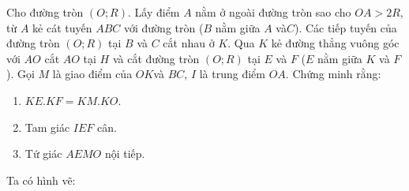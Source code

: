 \begin{ex}%
    Cho đường tròn $(O;R)$. Lấy điểm $A$ nằm ở ngoài đường tròn sao cho $OA>2R$, từ $A$ kẻ cát tuyến $ABC$ với đường tròn ($B$ nằm giữa $A$ và$C$). Các tiếp tuyến của đường tròn $(O;R)$ tại $B$ và $C$ cắt nhau ở $K$. Qua $K$ kẻ đường thẳng vuông góc với $AO$ cắt $AO$ tại $H$ và cắt đường tròn $(O;R)$ tại $E$ và $F$ ($E$ nằm giữa $K$ và $F$). Gọi $M$ là giao điểm của $OK $và $BC$, $I$ là trung điểm $OA$. Chứng minh rằng:
       \begin{enumerate}
        \item $KE.KF=KM.KO$.
        \item Tam giác $IEF$ cân.
        \item Tứ giác $AEMO$ nội tiếp.
       \end{enumerate}
\loigiai
    {Ta có hình vẽ:\\
    }
\end{ex}
